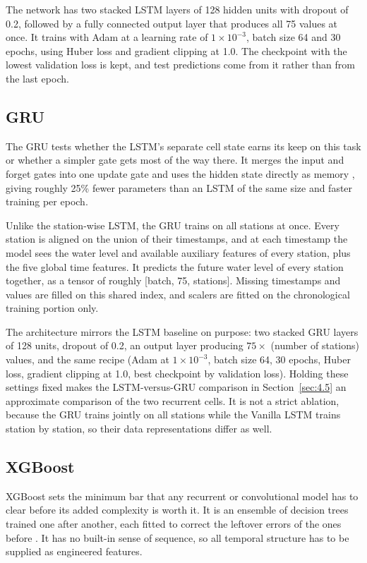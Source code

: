 The network has two stacked LSTM layers of 128 hidden units with dropout of 0.2,
followed by a fully connected output layer that produces all 75 values at once.
It trains with Adam at a learning rate of $1\times10^{-3}$, batch size 64 and 30
epochs, using Huber loss \cite{Huber1964} and gradient clipping at 1.0. The
checkpoint with the lowest validation loss is kept, and test predictions come
from it rather than from the last epoch.

\subsection{GRU}
\label{sec:3.13.2}

The GRU tests whether the LSTM's separate cell state earns its keep on this task
or whether a simpler gate gets most of the way there. It merges the input and
forget gates into one update gate and uses the hidden state directly as memory
\cite{Cho2014}, giving roughly 25\% fewer parameters than an LSTM of the same
size and faster training per epoch.

Unlike the station-wise LSTM, the GRU trains on all stations at once. Every
station is aligned on the union of their timestamps, and at each timestamp the
model sees the water level and available auxiliary features of every station,
plus the five global time features. It predicts the future water level of every
station together, as a tensor of roughly [batch, 75, stations]. Missing
timestamps and values are filled on this shared index, and scalers are fitted on
the chronological training portion only.

The architecture mirrors the LSTM baseline on purpose: two stacked GRU layers of
128 units, dropout of 0.2, an output layer producing $75 \times$ (number of
stations) values, and the same recipe (Adam at $1\times10^{-3}$, batch size 64,
30 epochs, Huber loss, gradient clipping at 1.0, best checkpoint by validation
loss). Holding these settings fixed makes the LSTM-versus-GRU comparison in
Section~\ref{sec:4.5} an approximate comparison of the two recurrent cells. It
is not a strict ablation, because the GRU trains jointly on all stations while
the Vanilla LSTM trains station by station, so their data representations differ
as well.

\subsection{XGBoost}
\label{sec:3.13.3}

XGBoost sets the minimum bar that any recurrent or convolutional model has to
clear before its added complexity is worth it. It is an ensemble of decision
trees trained one after another, each fitted to correct the leftover errors of
the ones before \cite{ChenGuestrin2016}. It has no built-in sense of sequence,
so all temporal structure has to be supplied as engineered features.

